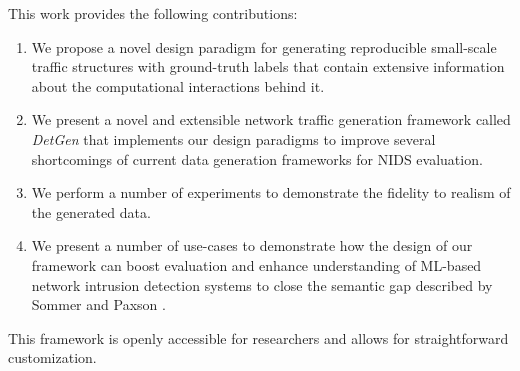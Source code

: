 \documentclass{article}
\begin{document}

 
This work provides the following contributions:

\begin{enumerate}
\item We propose a novel design paradigm for generating reproducible small-scale traffic structures with ground-truth labels that contain extensive information about the computational interactions behind it. 
\item We present a novel and extensible network traffic generation framework called \textit{DetGen} that implements our design paradigms to improve several shortcomings of current data generation frameworks for NIDS evaluation.
\item We perform a number of experiments to demonstrate the fidelity to realism of the generated data.
\item We present a number of use-cases to demonstrate how the design of our framework can boost evaluation and enhance understanding of ML-based network intrusion detection systems to close the semantic gap described by Sommer and Paxson \cite{sommer2010outside}.
\end{enumerate}

This framework is openly accessible for researchers and allows for straightforward customization.

\end{document}
